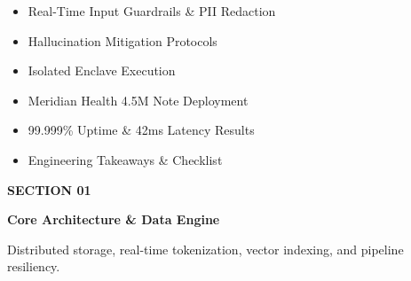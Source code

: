 \documentclass[20pt,landscape,a4paper]{foils}
\begin{document}
\par\vspace{6pt}

\noindent
\begin{minipage}[t]{0.48\textwidth}
  \begin{tcolorbox}[amberbox, title={\textcolor{NavyPrimary}{\large \faLock~ \textbf{Module 03: Zero-Trust Safety}}}, fonttitle=\bfseries]
    \begin{itemize}[leftmargin=16pt, label=\textcolor{AmberAccent}{\small\faCheck}]
      \item Real-Time Input Guardrails \& PII Redaction
      \item Hallucination Mitigation Protocols
      \item Isolated Enclave Execution
    \end{itemize}
  \end{tcolorbox}
\end{minipage}%
\hfill
\begin{minipage}[t]{0.48\textwidth}
  \begin{tcolorbox}[amberbox, title={\textcolor{NavyPrimary}{\large \faChartLine~ \textbf{Module 04: Production Case Study}}}, fonttitle=\bfseries]
    \begin{itemize}[leftmargin=16pt, label=\textcolor{AmberAccent}{\small\faCheck}]
      \item Meridian Health 4.5M Note Deployment
      \item 99.999\% Uptime \& 42ms Latency Results
      \item Engineering Takeaways \& Checklist
    \end{itemize}
  \end{tcolorbox}
\end{minipage}
\pagebreak

\vspace*{0.8cm}
\begin{tcolorbox}[enhanced, colback=SlateLight, colframe=NavyPrimary, boxrule=3pt, arc=6pt, boxsep=16pt]
  \textcolor{TealAccent}{\Large \textbf{SECTION 01}} \par\vspace{6pt}
  {\Huge\bfseries Core Architecture \& Data Engine} \par\vspace{10pt}
  \textcolor{CharcoalText}{\large Distributed storage, real-time tokenization, vector indexing, and pipeline resiliency.}
\end{tcolorbox}
\pagebreak
\end{document}
